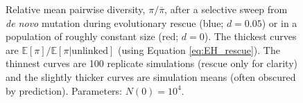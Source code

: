 \documentclass[]{article}
\begin{document}
\begin{figure}[htb]
\caption{
Relative mean pairwise diversity, $\pi/\overline{\pi}$, after a selective sweep from \textit{de novo} mutation during evolutionary rescue (blue; $d=0.05$) or in a population of roughly constant size (red; $d=0$).
The thickest curves are $\mathbb{E}[\pi]/\mathbb{E}[\pi|\mathrm{unlinked}]$ (using Equation \ref{eq:EH_rescue}).
The thinnest curves are 100 replicate simulations (rescue only for clarity) and the slightly thicker curves are simulation means (often obscured by prediction).
Parameters: $N(0)=10^4$.
}%
\label{fig:rescueDNM_heterozygosity_relative}
\end{figure}
\end{document}
